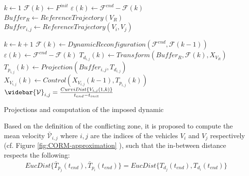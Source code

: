 \begin{enumerate}
\begin{algorithm}
\begin{small}
\DontPrintSemicolon
{}



$k \leftarrow 1$ \; 
$\mathcal{F}(k) \leftarrow {F^{init}}$\; 
$\varepsilon (k) \leftarrow  \mathcal{F}^{end}-\mathcal{F}(k)$\; 
$ Buffer_R \leftarrow ReferenceTrajectory(V_R)$\;
$ Buffer_{i,j} \leftarrow ReferenceTrajectory(V_i,V_j)$\;

{
  $k \leftarrow k+1$ \; 
  $\mathcal{F} (k) \leftarrow DynamicReconfiguration ( \mathcal{F}^{end},\mathcal{F}(k-1)) $\;
  $\varepsilon (k) \leftarrow  \mathcal{F}^{end}-\mathcal{F}(k)$\; 
  $T_{d_{i,j}}(k) \leftarrow Transform(Buffer_R,\mathcal{F}(k), X_{V_{R}})  $ \;
  ${T}_{p_{i,j}}(k) \leftarrow Projection(Buffer_{i,j},{T}_{d_{i,j}})  $ \;
  $X_{V_{i,j}} (k)  \leftarrow Control(X_{V_{i,j}} (k-1),{T}_{p_{i,j}}(k))$\; 
  }
  $\widebar{\mathcal V}_{i,j}= \frac{CurviDist \{V_{i,j}(1,k)\}}{t_{end}-t_{init}}$\;
 
\caption{\small Projections and computation of the imposed dynamic \label{alg: projection and computation of the mean velocity }}
\end{small}
\end{algorithm}




    Based on the definition of the conflicting zone, it is proposed to compute the mean velocity $\bar{\mathcal{V}}_{i,j}$ where $i,j$ are the indices of the vehicles $V_i$ and $V_j$ respectively (cf. Figure \ref{fig:CORM-approximation} ), such that the in-between distance respects the following:  
\begin{align}
    EucDist \{\bar{T}_{p_j}(t_{end}),\bar{T}_{p_i}(t_{end})\}= 
    EucDist \{T_{d_j}(t_{end}),T_{d_i}(t_{end})\}
\end{align}


\end{enumerate}
